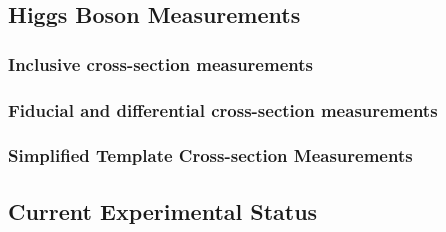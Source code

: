 \subsection{Higgs Boson Measurements}

\subsubsection{Inclusive cross-section measurements}
\subsubsection{Fiducial and differential cross-section measurements}
\subsubsection{Simplified Template Cross-section Measurements}

\subsection{Current Experimental Status}
